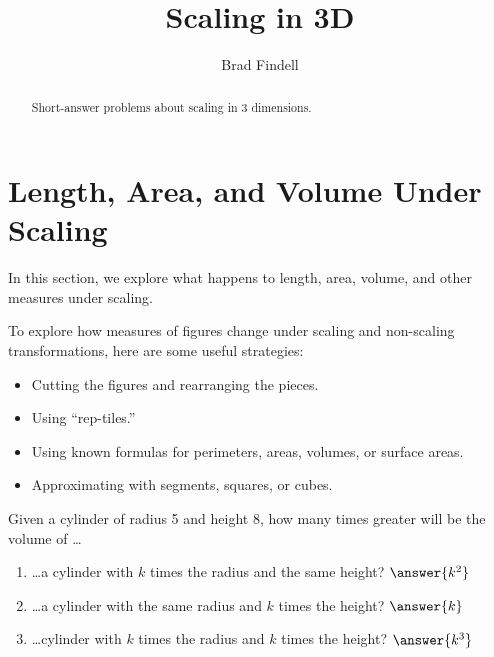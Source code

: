 \documentclass[nooutcomes]{ximera}
\title{Scaling in 3D}
\author{Brad Findell}
\begin{document}
\begin{abstract}
Short-answer problems about scaling in 3 dimensions. 
\end{abstract}
\maketitle




\section{Length, Area, and Volume Under Scaling}
In this section, we explore what happens to length, area, volume, and other measures under scaling.  
 

To explore how measures of figures change under scaling and non-scaling transformations, here are some useful strategies: 
\begin{itemize}
\item Cutting the figures and rearranging the pieces.  
\item Using ``rep-tiles.'' 
\item Using known formulas for perimeters, areas, volumes, or surface areas. 
\item Approximating with segments, squares, or cubes.  
\end{itemize}



\begin{question}
Given a cylinder of radius 5 and height 8, how many times greater will be the volume of \dots
\begin{enumerate}
\item \dots a cylinder with $k$ times the radius and the same height?  $\answer{k^2}$
\item \dots a cylinder with the same radius and $k$ times the height?  $\answer{k}$
\item \dots cylinder with $k$ times the radius and $k$ times the height?  $\answer{k^3}$
\end{enumerate}
\end{question}
\end{document}
